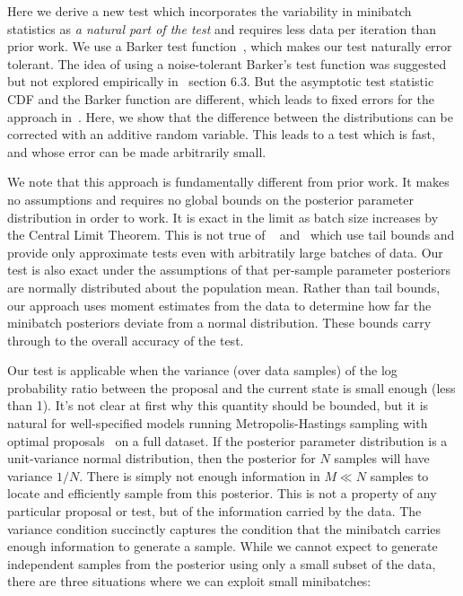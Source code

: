 \documentclass[letterpaper]{article}
\begin{document}
Here we derive a new test which incorporates the variability in minibatch
statistics as {\em a natural part of the test} and requires less data per
iteration than prior work. We use a Barker test function~\citep{Barker65}, which
makes our test naturally error tolerant. The idea of using a noise-tolerant
Barker's test function was suggested but not explored empirically
in~\citep{TallData16} section 6.3. But the asymptotic test statistic CDF and the
Barker function are different, which leads to fixed errors for the approach
in~\citep{TallData16}. Here, we show that the difference between the
distributions can be corrected with an additive random variable. This leads to a
test which is fast, and whose error can be made arbitrarily small.

We note that this approach is fundamentally different from prior
work. It makes no assumptions and requires no global bounds on the
posterior parameter distribution in order to work. It is exact in the
limit as batch size increases by the Central Limit Theorem. This is
not true of ~\citep{cutting_mh_2014} and~\citep{icml2014c1_bardenet14}
which use tail bounds and provide only approximate tests even with
arbitratily large batches of data. Our test is also exact under the
assumptions of \citep{cutting_mh_2014} that per-sample parameter
posteriors are normally distributed about the population mean.  Rather
than tail bounds, our approach uses moment estimates from the data to
determine how far the minibatch posteriors deviate from a normal
distribution.  These bounds carry through to the overall accuracy of
the test.

Our test is applicable when the variance (over data samples) of the
log probability ratio between the proposal and the current state is small
enough (less than 1). It's not clear at first why this quantity should
be bounded, but it is natural for well-specified models running
Metropolis-Hastings sampling with optimal
proposals~\citep{OptimalScaling01} on a full dataset. If the posterior
parameter distribution is a unit-variance normal distribution, then
the posterior for $N$ samples will have variance $1/N$. There is
simply not enough information in $M \ll N$ samples to locate and
efficiently sample from this posterior. This is not a property of any
particular proposal or test, but of the information carried by the
data. The variance condition succinctly captures the condition that
the minibatch carries enough information to generate a sample.  While
we cannot expect to generate independent samples from the posterior
using only a small subset of the data, there are three situations
where we can exploit small minibatches:
\end{document}
